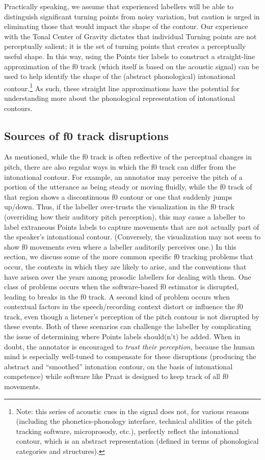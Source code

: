 \documentclass[11pt, twoside]{memoir}
\begin{document}
Practically speaking, we assume that experienced labellers will be able to distinguish significant turning points from noisy variation, but caution is urged in eliminating those that would impact the shape of the contour. Our experience with the Tonal Center of Gravity dictates that individual Turning points are not perceptually salient; it is the set of turning points that creates a perceptually useful shape. 
In this way, using the Points tier labels to construct a straight-line approximation of the f0 track (which itself is based on the acoustic signal) can be used to help identify the shape of the (abstract phonological) intonational contour.\footnote{Note: this series of acoustic cues in the signal does not, for various reasons (including the phonetics-phonology interface, technical abilities of the pitch tracking software, microprosody, etc.), perfectly reflect the intonational contour, which is an abstract representation (defined in terms of phonological categories and structures).} As such, these straight line approximations have the potential for understanding more about the phonological representation of intonational contours.
\subsection{Sources of f0 track disruptions}\label{sec:a-brief-overview-of-sources-of-pitch-track-disruptions}
As mentioned, while the f0 track is often reflective of the perceptual changes in pitch, there are also regular ways in which the f0 track can differ from the intonational contour. For example, an annotator may perceive the pitch of a portion of the utterance as being steady or moving fluidly, while the f0 track of that region shows a discontinuous f0 contour or one that suddenly jumps up\slash down. Thus, if the labeller over-trusts the visualization in the f0 track (overriding how their auditory pitch perception), this may cause a labeller to label extraneous Points labels to capture movements that are not actually part of the speaker’s intonational contour. (Conversely, the visualization may not seem to show f0 movements even where a labeller auditorily perceives one.) In this section, we discuss some of the more common specific f0 tracking problems that occur, the contexts in which they are likely to arise, and the conventions that have arisen over the years among prosodic labellers for dealing with them.
One class of problems occurs when the software-based f0 estimator is disrupted, leading to breaks in the f0 track. A second kind of problem occurs when contextual factors in the speech\slash recording context distort or influence the f0 track, even though a listener’s perception of the pitch contour is not disrupted by these events. Both of these scenarios can challenge the labeller by complicating the issue of determining where Points labels should(n’t) be added.
When in doubt, the annotator is encouraged to \emph{trust their perception}, because the human mind is especially well-tuned to compensate for these disruptions (producing the abstract and “smoothed” intonation contour, on the basis of intonational competence) while software like Praat is designed to keep track of all f0 movements.
\end{document}
